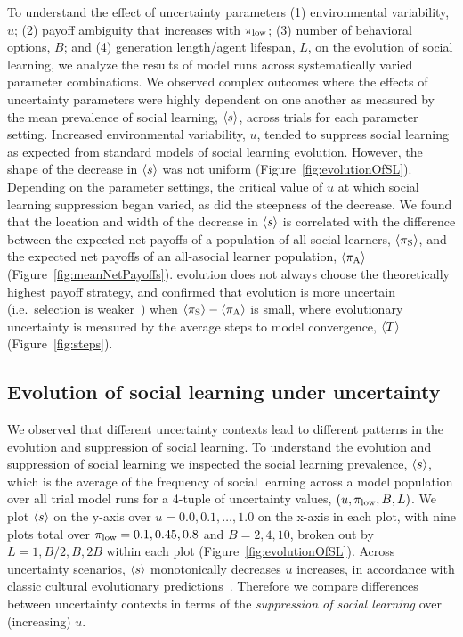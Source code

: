 \documentclass[letterpaper,11.5pt]{scrartcl}
\begin{document}
To understand the effect of uncertainty parameters (1) environmental variability, $u$; (2) payoff
ambiguity that increases with $\pi_{\mathrm{low}}$; (3) number of behavioral options, $B$; and 
(4) generation length/agent lifespan, $L$, on the evolution of social learning, we analyze the results of
model runs across systematically varied parameter combinations.  We observed complex
outcomes where the effects of uncertainty parameters were highly dependent on one
another as measured by the mean prevalence of social learning, $\langle s \rangle$, across
trials for each parameter setting.  Increased environmental variability, $u$, 
tended to suppress social learning as expected from standard models of
social learning evolution. However, the shape of the decrease in $\langle s \rangle$ 
was not uniform (Figure~\ref{fig:evolutionOfSL}). 
Depending on the parameter settings, the critical value of $u$ at which social 
learning suppression began varied, as did the steepness of the decrease. 
We found that the location and width of the decrease in $\langle s \rangle$ is correlated
with the difference between the expected net payoffs of a population of all
social learners, $\langle \pi_\mathrm{S} \rangle$, and the expected net payoffs
of an all-asocial learner population, $\langle \pi_\mathrm{A} \rangle$ (Figure~\ref{fig:meanNetPayoffs}). 
evolution does not always choose the theoretically highest payoff strategy,
and confirmed that evolution is more uncertain (i.e.\ selection is
weaker~\cite[p. 103]{BoydRicherson1985}) when $\langle \pi_\mathrm{S} \rangle - \langle \pi_\mathrm{A} \rangle$ is small, 
where evolutionary uncertainty is measured by the 
average steps to model convergence, $\langle T \rangle$ (Figure~\ref{fig:steps}).

\subsection{Evolution of social learning under uncertainty}

We observed that different uncertainty contexts lead to different patterns in
the evolution and suppression of social learning. To understand the evolution
and suppression of social learning we inspected the social learning prevalence,
$\langle s \rangle$, which is the average of the frequency of social learning across
a model population over all trial model runs for a 4-tuple of uncertainty
values, $(u, \pi_{\mathrm{low}}, B, L)$.  We plot $\langle s \rangle$ on the y-axis 
over $u=0.0,0.1,\ldots,1.0$ on the x-axis in each plot, with nine plots total over
$\pi_{\mathrm{low}}=0.1,0.45,0.8$ and $B=2,4,10$, broken out by $L=1,B/2,B,2B$ within each plot
(Figure~\ref{fig:evolutionOfSL}). Across uncertainty scenarios, $\langle s \rangle$ monotonically
decreases $u$ increases, in accordance with classic cultural evolutionary
predictions~\cite{CavalliFeldman1981,BoydRicherson1985,Feldman1996}.  Therefore we compare
differences between uncertainty contexts in terms of the \emph{suppression of social learning}
over (increasing) $u$. 
\end{document}
